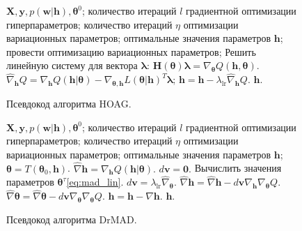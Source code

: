\begin{figure}
 \begin{algorithmic}[1]
\REQUIRE $\mathbf{X}, \mathbf{y}, p(\mathbf{w}|\mathbf{h}), \boldsymbol{\theta}^0$;
\REQUIRE количество итераций $l$ градиентной оптимизации гиперпараметров; 
\REQUIRE количество итераций $\eta$ оптимизации вариационных параметров;
\ENSURE оптимальные значения параметров $\mathbf{h}$;
\STATE провести оптимизацию вариационных параметров;
\STATE Решить линейную систему для вектора $\boldsymbol{\lambda}$: $\mathbf{H}(\boldsymbol{\theta})\boldsymbol{\lambda} =  \nabla_{\boldsymbol{\theta}} Q( \mathbf{h},\boldsymbol{\theta})$.
\STATE $\hat{\nabla}_{\mathbf{h}}Q = \nabla_{\mathbf{h}}Q(\mathbf{h}|\boldsymbol{\theta}) -\nabla_{\boldsymbol{\theta}, \mathbf{h}} L(\boldsymbol{\theta}| \mathbf{h})^T\boldsymbol{\lambda}$;
\STATE $\mathbf{h} = \mathbf{h} - \lambda_{\text{lr}}\hat{\nabla}_{\mathbf{h}}Q$.
\ENDFOR
\RETURN $\mathbf{h}$.
\end{algorithmic}
\caption{Псевдокод алгоритма HOAG.}
\label{alg:hoag}

\end{figure}


\begin{figure}
 \begin{algorithmic}[1]
\REQUIRE $\mathbf{X}, \mathbf{y}, p(\mathbf{w}|\mathbf{h}), \boldsymbol{\theta}^0$;
\REQUIRE количество итераций $l$ градиентной оптимизации гиперпараметров; 
\REQUIRE количество итераций $\eta$ оптимизации вариационных параметров;
\ENSURE оптимальные значения параметров $\mathbf{h}$;
\STATE $\boldsymbol{\theta} = T(\boldsymbol{\theta}_0, \mathbf{h})$.
\STATE $\hat{\nabla} \mathbf{h} = \nabla_\mathbf{h} Q( \mathbf{h}| \boldsymbol{\theta}).$ 
\STATE $d\mathbf{v} = \mathbf{0}.$
\STATE Вычислить значения параметров $\boldsymbol{\theta}^\tau$\eqref{eq:mad_lin}.
\STATE $d\mathbf{v} =   \lambda_{\text{lr}} \hat{\nabla}_{\boldsymbol{\theta}}$.
\STATE $\hat{\nabla} \mathbf{h} =  \hat{\nabla} \mathbf{h} - d\mathbf{v}\nabla_{\mathbf{h}} \nabla_{\boldsymbol{\theta}} Q$.
\STATE $\hat{\nabla} \boldsymbol{\theta}  = \hat{\nabla} \boldsymbol{\theta}  - d\mathbf{v}\nabla_{\boldsymbol{\theta}} \nabla_{\boldsymbol{\theta}} Q$.
\ENDFOR
\STATE $\mathbf{h} = \mathbf{h} - \hat{\nabla} \mathbf{h}.$
\ENDFOR
\RETURN $\mathbf{h}$.
\end{algorithmic}
\caption{Псевдокод алгоритма DrMAD.}
\label{alg:drmad}

\end{figure}

